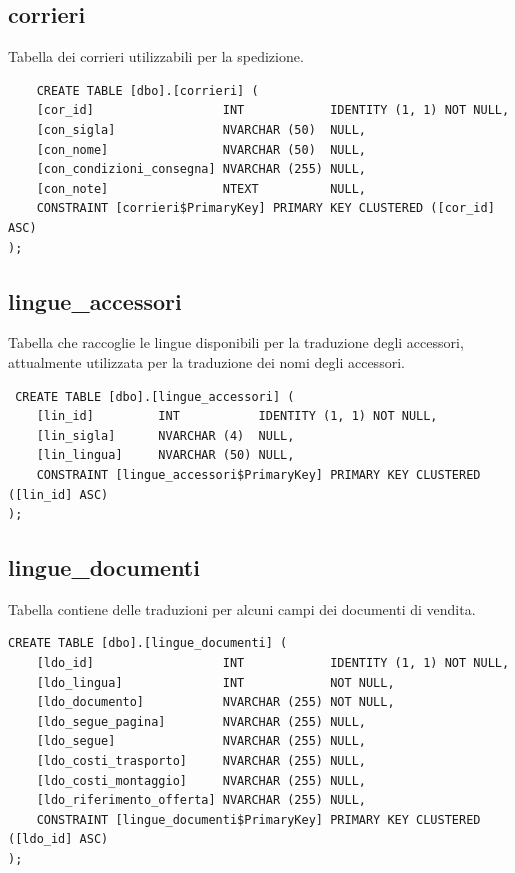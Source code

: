 \documentclass[12pt]{article}
\begin{document}
\subsection{corrieri}
Tabella dei corrieri utilizzabili per la spedizione.
\begin{lstlisting}
    CREATE TABLE [dbo].[corrieri] (
    [cor_id]                  INT            IDENTITY (1, 1) NOT NULL,
    [con_sigla]               NVARCHAR (50)  NULL,
    [con_nome]                NVARCHAR (50)  NULL,
    [con_condizioni_consegna] NVARCHAR (255) NULL,
    [con_note]                NTEXT          NULL,
    CONSTRAINT [corrieri$PrimaryKey] PRIMARY KEY CLUSTERED ([cor_id] ASC)
);

\end{lstlisting}

\subsection{lingue\_accessori}
Tabella che raccoglie le lingue disponibili per la traduzione degli accessori, attualmente utilizzata per la traduzione dei nomi degli accessori.
\begin{lstlisting}
 CREATE TABLE [dbo].[lingue_accessori] (
    [lin_id]         INT           IDENTITY (1, 1) NOT NULL,
    [lin_sigla]      NVARCHAR (4)  NULL,
    [lin_lingua]     NVARCHAR (50) NULL,
    CONSTRAINT [lingue_accessori$PrimaryKey] PRIMARY KEY CLUSTERED ([lin_id] ASC)
);

\end{lstlisting}

\subsection{lingue\_documenti}
Tabella contiene delle traduzioni per alcuni campi dei documenti di vendita.
\begin{lstlisting}
CREATE TABLE [dbo].[lingue_documenti] (
    [ldo_id]                  INT            IDENTITY (1, 1) NOT NULL,
    [ldo_lingua]              INT            NOT NULL,
    [ldo_documento]           NVARCHAR (255) NOT NULL,
    [ldo_segue_pagina]        NVARCHAR (255) NULL,
    [ldo_segue]               NVARCHAR (255) NULL,
    [ldo_costi_trasporto]     NVARCHAR (255) NULL,
    [ldo_costi_montaggio]     NVARCHAR (255) NULL,
    [ldo_riferimento_offerta] NVARCHAR (255) NULL,
    CONSTRAINT [lingue_documenti$PrimaryKey] PRIMARY KEY CLUSTERED ([ldo_id] ASC)
);
\end{lstlisting}
\end{document}
